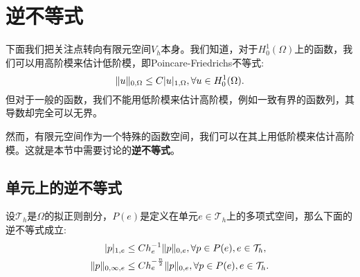 \section{逆不等式}
下面我们把关注点转向有限元空间$V_{h}$本身。我们知道，对于$H_{0}^{1}(\Omega)$上的函数，我们可以用高阶模来估计低阶模，即Poincare-Friedrichs不等式:
\begin{equation}
    \|u\|_{0,\Omega}\le C|u|_{1,\Omega},\forall u\in H_{0}^{1}(\Omega).
\end{equation}
但对于一般的函数，我们不能用低阶模来估计高阶模，例如一致有界的函数列，其导数却完全可以无界。

然而，有限元空间作为一个特殊的函数空间，我们可以在其上用低阶模来估计高阶模。这就是本节中需要讨论的\textbf{逆不等式}。

\subsection{单元上的逆不等式}
\begin{theorem}
    设$\mathcal{T}_{h}$是$\Omega$的拟正则剖分，$P(e)$是定义在单元$e\in\mathcal{T}_{h}$上的多项式空间，那么下面的逆不等式成立:
    \begin{equation}
        \begin{aligned}
            |p|_{1,e}&\le Ch_{e}^{-1}\|p\|_{0,e},\forall p\in P(e),e\in\mathcal{T}_{h},\\
            \|p\|_{0,\infty,e}&\le Ch_{e}^{-\frac{n}{2}}\|p\|_{0,e},\forall p\in P(e),e\in\mathcal{T}_{h}.
        \end{aligned}
    \end{equation}
\end{theorem}

